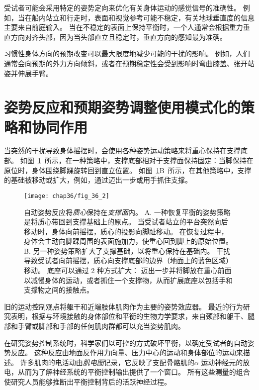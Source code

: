 受试者可能会采用特定的姿势定向来优化有关身体运动的感觉信号的准确性。
例如，当在船内站立和行走时，表面和视觉参考可能不稳定，有关地球垂直度的信息主要来自前庭输入。
当在不稳定的表面上保持平衡时，一个人通常会根据重力垂直方向对齐头部，因为当头部直立且稳定时，垂直方向的感知最为准确。


习惯性身体方向的预期改变可以最大限度地减少可能的干扰的影响。
例如，人们通常会向预期的外力方向倾斜，或者在预期稳定性会受到影响时弯曲膝盖、张开站姿并伸展手臂。



\section{姿势反应和预期姿势调整使用模式化的策略和协同作用}

当突然的干扰导致身体摇摆时，会使用各种姿势运动策略来将重心保持在支撑底部。
如图~\ref{fig:36_2}~所示，在一种策略中，支撑底部相对于支撑面保持固定：当脚保持在原位时，身体围绕脚踝旋转回到直立位置。
如图~\ref{fig:36_2}B~所示，在其他策略中，支撑的基础被移动或扩大，例如，通过迈出一步或用手抓住支撑。


\begin{figure}[htbp]
	\centering
	\texttt{[image: chap36/fig\_36\_2]}
	\caption{自动姿势反应将\textit{质心}保持在\textit{支撑面}内。
		A. 一种恢复平衡的姿势策略是将质心带回到支撑基础上的原点。
		当受试者站立的平台突然向后移动时，身体向前摇摆，质心的投影向脚趾移动。
		在恢复过程中，身体会主动向脚踝周围的表面施加力，使重心回到脚上的原始位置。
		B. 另一种姿势策略扩大了支撑基础，以将重心保持在基础内。
		干扰导致受试者向前摇摆，质心向支撑底部的边界（地面上的蓝色区域）移动。
		底座可以通过 2 种方式扩大：
		迈出一步并将脚放在重心前面以减慢身体的运动，或者抓住一个支撑物，从而扩展底座以包括手和支撑物之间的接触点。}
	\label{fig:36_2}
\end{figure}


旧的运动控制观点将躯干和近端肢体肌肉作为主要的姿势效应器。
最近的行为研究表明，根据与环境接触的身体部位和平衡的生物力学要求，来自颈部和躯干、腿部和手臂或脚部和手部的任何肌肉群都可以充当姿势肌肉。


在研究姿势控制系统时，科学家们以可控的方式破坏平衡，以确定受试者的自动姿势反应。
这种反应由地面反作用力向量、压力中心的运动和身体部位的运动来描述。
许多肌肉的电活动由\textit{肌电图}记录，它反映了支配骨骼肌的$ \alpha $ 运动神经元的放电，从而为了解神经系统的平衡控制输出提供了一个窗口。
所有这些测量的组合使研究人员能够推断出平衡控制背后的活跃神经过程。



